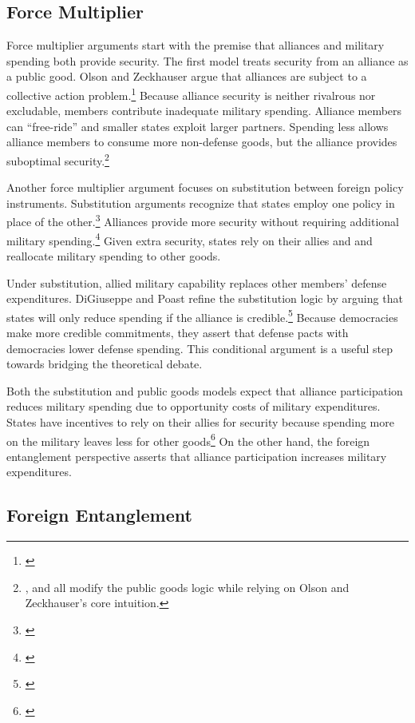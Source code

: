 \documentclass[12pt]{article}
\begin{document}
\subsection{Force Multiplier} 


Force multiplier arguments start with the premise that alliances and military spending both provide security.
The first model treats security from an alliance as a public good. 
Olson and Zeckhauser argue that alliances are subject to a collective action problem.\footnote{\citep{OlsonZeckhauser1966}}
Because alliance security is neither rivalrous nor excludable, members contribute inadequate military spending. 
Alliance members can ``free-ride'' and smaller states exploit larger partners. 
Spending less allows alliance members to consume more non-defense goods, but the alliance provides suboptimal security.\footnote{\citet{SandlerForbes1980}, \citet{Oneal1990} and \citet{SandlerHartley2001} all modify the public goods logic while relying on Olson and Zeckhauser's core intuition.} 


Another force multiplier argument focuses on substitution between foreign policy instruments.
Substitution arguments recognize that states employ one policy in place of the other.\footnote{\citep{MostStarr1989}}
Alliances provide more security without requiring additional military spending.\footnote{\citep{Morrow1993, Conybeare1994}}
Given extra security, states rely on their allies and and reallocate military spending to other goods. 


Under substitution, allied military capability replaces other members' defense expenditures. 
DiGiuseppe and Poast refine the substitution logic by arguing that states will only reduce spending if the alliance is credible.\footnote{\citep{DigiuseppePoast2016}}
Because democracies make more credible commitments, they assert that defense pacts with democracies lower defense spending.
This conditional argument is a useful step towards bridging the theoretical debate. 


Both the substitution and public goods models expect that alliance participation reduces military spending due to opportunity costs of military expenditures. 
States have incentives to rely on their allies for security because spending more on the military leaves less for other goods\footnote{\citep{Fordham1998}}
On the other hand, the foreign entanglement perspective asserts that alliance participation increases military expenditures. 


\subsection{Foreign Entanglement}
\end{document}
